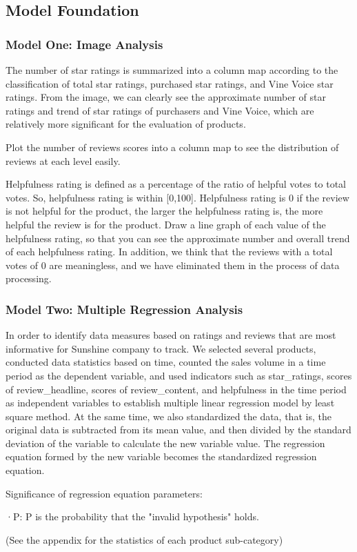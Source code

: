 \documentclass[12pt]{article}
\begin{document}
\subsection{Model Foundation}
\subsubsection{Model One: Image Analysis}
\quad\par\par
The number of star ratings is summarized into a column map according to the classification of total star ratings, purchased star ratings, and Vine Voice star ratings. From the image, we can clearly see the approximate number of star ratings and trend of star ratings of purchasers and Vine Voice, which are relatively more significant for the evaluation of products.
\par
Plot the number of reviews scores into a column map to see the distribution of reviews at each level easily.
\par
Helpfulness rating is defined as a percentage of the ratio of helpful votes to total votes. So, helpfulness rating is within [0,100]. Helpfulness rating is 0 if the review is not helpful for the product, the larger the helpfulness rating is, the more helpful the review is for the product. Draw a line graph of each value of the helpfulness rating, so that you can see the approximate number and overall trend of each helpfulness rating. In addition, we think that the reviews with a total votes of 0 are meaningless, and we have eliminated them in the process of data processing.
\subsubsection{Model Two: Multiple Regression Analysis}
\quad\par\par
In order to identify data measures based on ratings and reviews that are most informative for Sunshine company to track. We selected several products, conducted data statistics based on time,
counted the sales volume in a time period as the dependent variable, and used indicators such as 
star\_ratings, scores of review\_headline, scores of review\_content,
 and helpfulness in the time period
 as independent variables to establish multiple linear regression model by least square method.
At the same time, we also standardized the data, that is, the original data is subtracted from its mean value, and then divided by the standard deviation of the variable to calculate the new variable value. The regression equation formed by the new variable becomes the standardized regression equation.
\par
Significance of regression equation parameters:
\par
·P: P is the probability that the "invalid hypothesis" holds.
\par
	(See the appendix for the statistics of each product sub-category)
\end{document}
